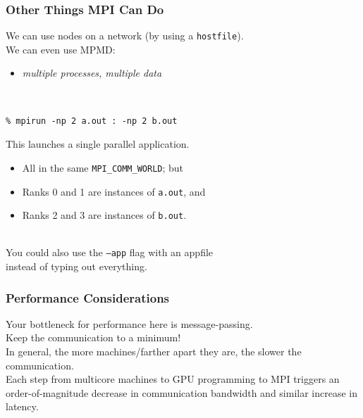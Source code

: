 \begin{frame}[fragile]
  \frametitle{Other Things MPI Can Do}
  
  

    We can use nodes on a network (by using a {\tt hostfile}).\\[1em]
    We can even use MPMD:
      \begin{itemize}
        \item {\it multiple processes, multiple data}
      \end{itemize}~\\

  \begin{lstlisting}
% mpirun -np 2 a.out : -np 2 b.out
  \end{lstlisting}

  This launches a single parallel application.

  \begin{itemize}
    \item All in the same {\tt MPI\_COMM\_WORLD}; but
    \item Ranks 0 and 1 are instances of {\tt a.out}, and
    \item Ranks 2 and 3 are instances of {\tt b.out}.
  \end{itemize}~\\

  You could also use the {\tt --app} flag with an appfile \\ instead of typing out
  everything.
  
\end{frame}

\begin{frame}
  \frametitle{Performance Considerations}

  

 Your bottleneck for performance here is message-passing.\\[1em]
 Keep the communication to a minimum!\\[1em]
 In general, the more machines/farther apart they are, the slower the communication.\\[1em]

Each step from multicore
machines to GPU programming to MPI triggers an
order-of-magnitude decrease in communication bandwidth and  similar
increase in latency.
  
\end{frame}

